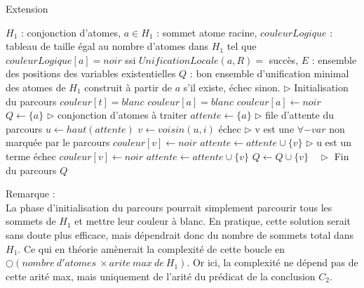 \begin{center}
\begin{algorithm}[H]
\caption{Extension}\label{extension}
\begin{algorithmic}[1]
\REQUIRE	$H_{1}$ : conjonction d'atomes, 
			$a \in H_{1}$ : sommet atome racine, 
			$couleurLogique$ : tableau de taille \'egal au nombre d'atomes dans $H_{1}$ tel que $couleurLogique[a] = noir$ ssi $UnificationLocale(a,R) =$ succ\`es, 
			$E$ : ensemble des positions des variables existentielles
\ENSURE $Q$ : bon ensemble d'unification minimal des atomes de ${H_1}$ construit \`a partir de $a$ s'il existe, \'echec sinon.
\STATE $\triangleright$ Initialisation du parcours
{}
			\STATE $couleur[t] = blanc$
		\ENDFOR
		\STATE $couleur[a] = blanc$
	\ENDIF
\ENDFOR
\STATE $couleur[a] \leftarrow noir$
\STATE $Q \leftarrow \{a\}$   $\triangleright$ conjonction d'atomes \`a traiter
\STATE $attente \leftarrow \{a\}$   $\triangleright$ file d'attente du parcours
	\STATE $u \leftarrow haut(attente)$
			\STATE $v \leftarrow voisin(u,i)$
				\RETURN \'echec	
				\STATE $\triangleright$ v est une $\forall-var$ non marqu\'ee par le parcours
				\STATE $couleur[v] \leftarrow noir$
				\STATE $attente \leftarrow attente \cup \{v\}$
			\ENDIF
		\ENDFOR
	\ELSE
		\STATE $\triangleright$ u est un terme
				\RETURN \'echec
			\ELSE
					\STATE $couleur[v] \leftarrow noir$
					\STATE $attente \leftarrow attente \cup \{v\}$
					\STATE $Q \leftarrow Q \cup \{v\}$
				\ENDIF
			\ENDIF
		\ENDFOR
	\ENDIF
\ENDWHILE $\ \ \ \triangleright$ Fin du parcours
\RETURN $Q$
\end{algorithmic}
\end{algorithm}
\end{center}

Remarque : \\
La phase d'initialisation du parcours pourrait simplement parcourir tous les sommets de $H_{1}$ et mettre leur couleur \`a blanc.
En pratique, cette solution serait sans doute plus efficace, mais d\'ependrait donc du nombre de sommets total dans $H_{1}$.
Ce qui en th\'eorie am\`enerait la complexit\'e de cette boucle en $\bigcirc(nombre\ d'atomes\ \times arite\ max\ de\ H_{1})$.
Or ici, la complexit\'e ne d\'epend pas de cette arit\'e max, mais uniquement de l'arit\'e du pr\'edicat de la conclusion $C_{2}$.

